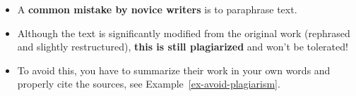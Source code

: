 \documentclass[11pt,a4paper]{article}
\begin{document}
\begin{badexample}
  \begin{figure}[H]
    \centering%
    {%
      \setlength{\fboxsep}{0pt}%
      \setlength{\fboxrule}{2pt}%
    }
  \end{figure}
  \begin{itemize}
    \item A \textbf{common mistake by novice writers} is to paraphrase text.
    \item Although the text is significantly modified from the original work (rephrased and slightly restructured), \textbf{this is still plagiarized} and won't be tolerated!
    \item To avoid this, you have to summarize their work in your own words and properly cite the sources, see Example~\ref{ex-avoid-plagiarism}.
  \end{itemize}
\end{badexample}
\end{document}
